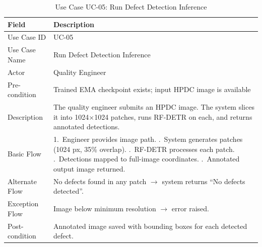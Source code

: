 \begin{table}[H]
\centering
\caption{Use Case UC-05: Run Defect Detection Inference}
\begin{tabular}{p{3.5cm} p{9cm}}
\toprule
\rowcolor{tableHeader}\tableheadfont Field & \tableheadfont Description \\
\midrule
Use Case ID       & UC-05 \\
\rowcolor{tableRowAlt}Use Case Name     & Run Defect Detection Inference \\
Actor             & Quality Engineer \\
\rowcolor{tableRowAlt}Pre-condition     & Trained EMA checkpoint exists; input HPDC image is available \\
Description       & The quality engineer submits an HPDC image. The system slices it into 1024$\times$1024 patches, runs RF-DETR on each, and returns annotated detections. \\
\rowcolor{tableRowAlt}Basic Flow        & 1.\ Engineer provides image path. \newline 2.\ System generates patches (1024 px, 35\% overlap). \newline 3.\ RF-DETR processes each patch. \newline 4.\ Detections mapped to full-image coordinates. \newline 5.\ Annotated output image returned. \\
Alternate Flow    & No defects found in any patch $\to$ system returns ``No defects detected''. \\
\rowcolor{tableRowAlt}Exception Flow    & Image below minimum resolution $\to$ error raised. \\
Post-condition    & Annotated image saved with bounding boxes for each detected defect. \\
\bottomrule
\end{tabular}
\end{table}

